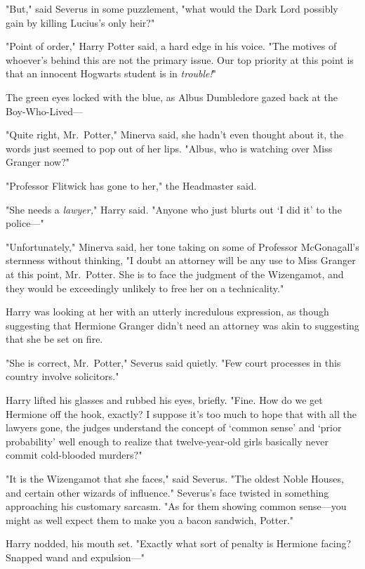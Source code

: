 "But," said Severus in some puzzlement, "what would the Dark Lord possibly gain
by killing Lucius's only heir?"

"Point of order," Harry Potter said, a hard edge in his voice. "The motives of
whoever's behind this are not the primary issue. Our top priority at this point
is that an innocent Hogwarts student is in \emph{trouble!}"

The green eyes locked with the blue, as Albus Dumbledore gazed back at the
Boy-Who-Lived---

"Quite right, Mr.~Potter," Minerva said, she hadn't even thought about it, the
words just seemed to pop out of her lips. "Albus, who is watching over Miss
Granger now?"

"Professor Flitwick has gone to her," the Headmaster said.

"She needs a \emph{lawyer,}" Harry said. "Anyone who just blurts out `I did it'
to the police\mbox{---}"

"Unfortunately," Minerva said, her tone taking on some of Professor
McGonagall's sternness without thinking, "I doubt an attorney will be any use
to Miss Granger at this point, Mr.~Potter. She is to face the judgment of the
Wizengamot, and they would be exceedingly unlikely to free her on a
technicality."

Harry was looking at her with an utterly incredulous expression, as though
suggesting that Hermione Granger didn't need an attorney was akin to suggesting
that she be set on fire.

"She is correct, Mr.~Potter," Severus said quietly. "Few court processes in
this country involve solicitors."

Harry lifted his glasses and rubbed his eyes, briefly. "Fine. How do we get
Hermione off the hook, exactly? I suppose it's too much to hope that with all
the lawyers gone, the judges understand the concept of `common sense' and
`prior probability' well enough to realize that twelve-year-old girls basically
never commit cold-blooded murders?"

"It is the Wizengamot that she faces," said Severus. "The oldest Noble Houses,
and certain other wizards of influence." Severus's face twisted in something
approaching his customary sarcasm. "As for them showing common sense---you
might as well expect them to make you a bacon sandwich, Potter."

Harry nodded, his mouth set. "Exactly what sort of penalty is Hermione facing?
Snapped wand and expulsion\mbox{---}"

